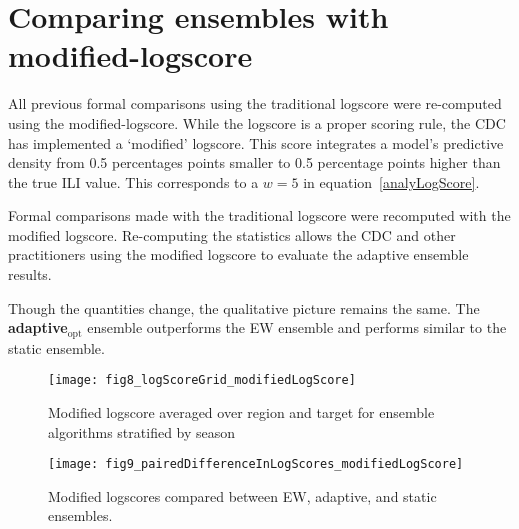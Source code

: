 \documentclass[12pt]{article}
\def\adaptOpt{\textbf{adaptive$_{\text{opt}}$ }}
\begin{document}
\begin{table}[ht!]
\caption{
Random effects regressions compared logscores between the \adaptOpt vs equally-weighted and \adaptOpt vs static ensembles.
The model included an intercept, and separate random effect for: season, region, and target.
The dependent variables is the difference in logscores paired by season-region-target-epidemic week.
Conditional mean, 95\%CI, asymptotic, and a permutation based p-value are reported.}

\end{table}


\clearpage
\section{Comparing ensembles with modified-logscore}
\label{suppl4.comparison}

All previous formal comparisons using the traditional logscore were re-computed using the modified-logscore.
While the logscore is a proper scoring rule, the CDC has implemented a `modified' logscore.
This score integrates a model's predictive density from 0.5 percentages points smaller to 0.5 percentage points higher than the true ILI value.
This corresponds to a $w=5$ in equation~\ref{analyLogScore}.

Formal comparisons made with the traditional logscore were recomputed with the modified logscore.
Re-computing the statistics allows the CDC and other practitioners using the modified logscore to evaluate the adaptive ensemble results.

Though the quantities change, the qualitative picture remains the same.
The \adaptOpt ensemble outperforms the EW ensemble and performs similar to the static ensemble.

\graphicspath{{../_6_TLGs/_G/fig8_logScoreGrid_modifiedLogScore/}}
\begin{figure}[ht!]
  \centering
  \texttt{[image: fig8\_logScoreGrid\_modifiedLogScore]}
  \caption{ Modified logscore averaged over region and target for ensemble algorithms stratified by season \label{fig8.logScoreGrid__modifiedLogScore}}
\end{figure}

\graphicspath{{../_6_TLGs/_G/fig9_pairedDifferenceInLogScores_modifiedLogScore/}}
\begin{figure}[ht!]
  \centering
  \texttt{[image: fig9\_pairedDifferenceInLogScores\_modifiedLogScore]}
  \caption{Modified logscores compared between EW, adaptive, and static ensembles.  \label{fig9.pairedDifferenceInLogScores__modifiedLogScores}}
\end{figure}
\end{document}
